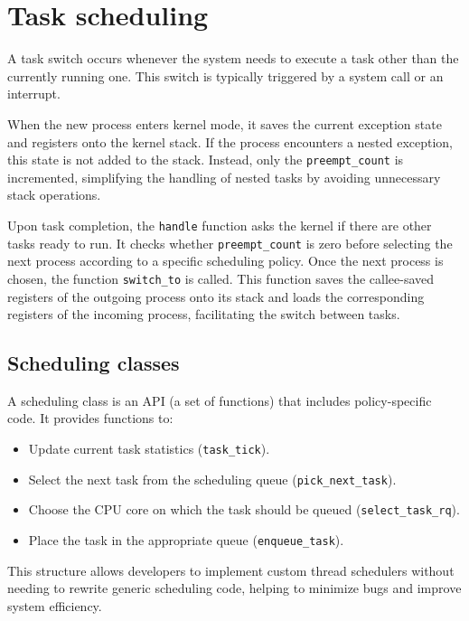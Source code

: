 \section{Task scheduling}

A task switch occurs whenever the system needs to execute a task other than the currently running one. 
This switch is typically triggered by a system call or an interrupt.

When the new process enters kernel mode, it saves the current exception state and registers onto the kernel stack. 
If the process encounters a nested exception, this state is not added to the stack. 
Instead, only the \texttt{preempt\_count} is incremented, simplifying the handling of nested tasks by avoiding unnecessary stack operations.

Upon task completion, the \texttt{handle} function asks the kernel if there are other tasks ready to run. 
It checks whether \texttt{preempt\_count} is zero before selecting the next process according to a specific scheduling policy. 
Once the next process is chosen, the function \texttt{switch\_to} is called. 
This function saves the callee-saved registers of the outgoing process onto its stack and loads the corresponding registers of the incoming process, facilitating the switch between tasks.

\subsection{Scheduling classes}
A scheduling class is an API (a set of functions) that includes policy-specific code. It provides functions to:
\begin{itemize}
    \item Update current task statistics (\texttt{task\_tick}).
    \item Select the next task from the scheduling queue (\texttt{pick\_next\_task}).
    \item Choose the CPU core on which the task should be queued (\texttt{select\_task\_rq}).
    \item Place the task in the appropriate queue (\texttt{enqueue\_task}).
\end{itemize}
This structure allows developers to implement custom thread schedulers without needing to rewrite generic scheduling code, helping to minimize bugs and improve system efficiency.